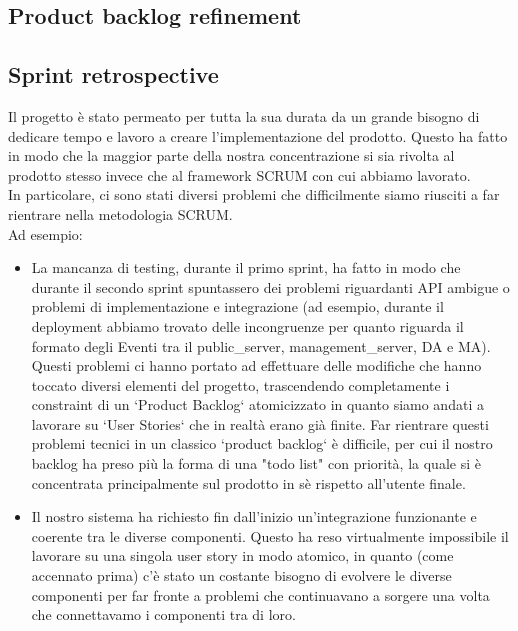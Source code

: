 \documentclass{article}
\begin{document}
\subsection{Product backlog refinement}

\subsection{Sprint retrospective}

Il progetto è stato permeato per tutta la sua durata da un grande bisogno di dedicare tempo e lavoro a creare l'implementazione del prodotto. Questo ha fatto in modo che la maggior parte della nostra concentrazione si sia rivolta al prodotto stesso invece che al framework SCRUM con cui abbiamo lavorato.\\
In particolare, ci sono stati diversi problemi che difficilmente siamo riusciti a far rientrare nella metodologia SCRUM.\\
Ad esempio:
\begin{itemize}
    \item La mancanza di testing, durante il primo sprint, ha fatto in modo che durante il secondo sprint spuntassero dei problemi riguardanti API ambigue o problemi di implementazione e integrazione (ad esempio, durante il deployment abbiamo trovato delle incongruenze per quanto riguarda il formato degli Eventi tra il public\_server, management\_server, DA e MA). Questi problemi ci hanno portato ad effettuare delle modifiche che hanno toccato diversi elementi del progetto, trascendendo completamente i constraint di un `Product Backlog` atomicizzato in quanto siamo andati a lavorare su `User Stories` che in realtà erano già finite. Far rientrare questi problemi tecnici in un classico `product backlog` è difficile, per cui il nostro backlog ha preso più la forma di una "todo list" con priorità, la quale si è concentrata principalmente sul prodotto in sè rispetto all'utente finale. 
    \item Il nostro sistema ha richiesto fin dall'inizio un'integrazione funzionante e coerente tra le diverse componenti. Questo ha reso virtualmente impossibile il lavorare su una singola user story in modo atomico, in quanto (come accennato prima) c'è stato un costante bisogno di evolvere le diverse componenti per far fronte a problemi che continuavano a sorgere una volta che connettavamo i componenti tra di loro.\\
\end{itemize}
\end{document}
